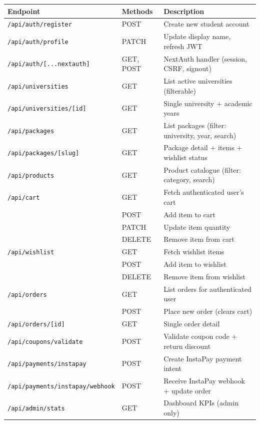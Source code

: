 \documentclass[12pt, a4paper]{article}
\begin{document}
\begin{longtable}{@{}p{5.5cm}lp{6.5cm}@{}}
\toprule
\textbf{Endpoint} & \textbf{Methods} & \textbf{Description} \\
\midrule
\endhead
\texttt{/api/auth/register}        & POST          & Create new student account \\
\texttt{/api/auth/profile}         & PATCH         & Update display name, refresh JWT \\
\texttt{/api/auth/[...nextauth]}   & GET, POST     & NextAuth handler (session, CSRF, signout) \\
\midrule
\texttt{/api/universities}         & GET           & List active universities (filterable) \\
\texttt{/api/universities/[id]}    & GET           & Single university + academic years \\
\midrule
\texttt{/api/packages}             & GET           & List packages (filter: university, year, search) \\
\texttt{/api/packages/[slug]}      & GET           & Package detail + items + wishlist status \\
\midrule
\texttt{/api/products}             & GET           & Product catalogue (filter: category, search) \\
\midrule
\texttt{/api/cart}                 & GET           & Fetch authenticated user's cart \\
                                   & POST          & Add item to cart \\
                                   & PATCH         & Update item quantity \\
                                   & DELETE        & Remove item from cart \\
\midrule
\texttt{/api/wishlist}             & GET           & Fetch wishlist items \\
                                   & POST          & Add item to wishlist \\
                                   & DELETE        & Remove item from wishlist \\
\midrule
\texttt{/api/orders}               & GET           & List orders for authenticated user \\
                                   & POST          & Place new order (clears cart) \\
\texttt{/api/orders/[id]}          & GET           & Single order detail \\
\midrule
\texttt{/api/coupons/validate}     & POST          & Validate coupon code + return discount \\
\midrule
\texttt{/api/payments/instapay}    & POST          & Create InstaPay payment intent \\
\texttt{/api/payments/instapay/webhook} & POST     & Receive InstaPay webhook + update order \\
\midrule
\texttt{/api/admin/stats}          & GET           & Dashboard KPIs (admin only) \\
\bottomrule
\end{longtable}
\end{document}
